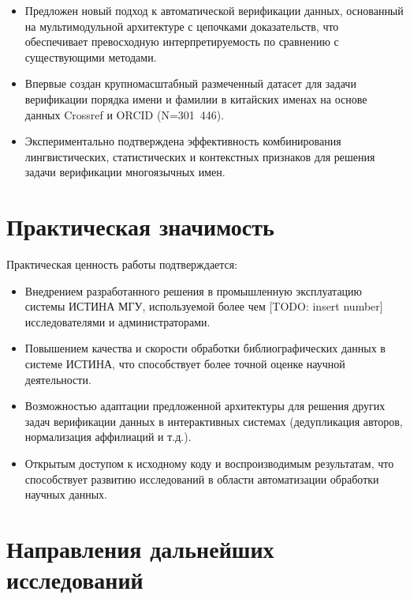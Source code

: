 \begin{itemize}
    \item Предложен новый подход к автоматической верификации данных, основанный на мультимодульной архитектуре с цепочками доказательств, что обеспечивает превосходную интерпретируемость по сравнению с существующими методами.

    \item Впервые создан крупномасштабный размеченный датасет для задачи верификации порядка имени и фамилии в китайских именах на основе данных Crossref и ORCID (N=301~446).

    \item Экспериментально подтверждена эффективность комбинирования лингвистических, статистических и контекстных признаков для решения задачи верификации многоязычных имен.
\end{itemize}

\section{Практическая значимость}
\label{sec:concl:practical}

Практическая ценность работы подтверждается:

\begin{itemize}
    \item Внедрением разработанного решения в промышленную эксплуатацию системы ИСТИНА МГУ, используемой более чем [TODO: insert number] исследователями и администраторами.

    \item Повышением качества и скорости обработки библиографических данных в системе ИСТИНА, что способствует более точной оценке научной деятельности.

    \item Возможностью адаптации предложенной архитектуры для решения других задач верификации данных в интерактивных системах (дедупликация авторов, нормализация аффилиаций и т.д.).

    \item Открытым доступом к исходному коду и воспроизводимым результатам, что способствует развитию исследований в области автоматизации обработки научных данных.
\end{itemize}

\section{Направления дальнейших исследований}
\label{sec:concl:future}

